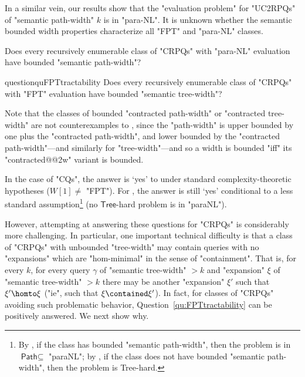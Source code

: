 In a similar vein, our results show that the "evaluation problem" for "UC2RPQs"
of "semantic path-width" $k$ is in "para-NL". It is unknown whether the semantic bounded width properties characterize all "FPT" and "para-NL" classes.

\begin{question}\AP\label{qu:paraNLtractability}
    Does every recursively enumerable class of "CRPQs" with "para-NL" evaluation have bounded "semantic path-width"?
\end{question}

\begin{restatable}{question}{quFPTtractability}
    \AP\label{qu:FPTtractability}
    Does every recursively enumerable class of "CRPQs" with "FPT" evaluation have bounded "semantic tree-width"?
\end{restatable}

Note that the classes of bounded "contracted path-width" or "contracted tree-width" are not counterexamples to , since
the "path-width" is upper bounded by one plus the "contracted path-width", and lower bounded by the "contracted path-width"---and similarly for "tree-width"---and so a width is bounded "iff" its "contracted@@2w" variant is bounded.

In the case of "CQs", the answer is `yes' to  \cite[Theorem~1]{Grohe2007ComplexityHomomorphism}
under standard complexity-theoretic hypotheses ($W[1] \neq $ "FPT"). For , the answer is still `yes' \cite[Theorem 3.1]{ChenMoritz13} conditional to a less standard assumption\footnote{By \cite[Theorems 3.1 \& 4.3]{ChenMoritz13}, if the class has bounded "semantic path-width", then the problem is in $\textsf{Path} \subseteq $ "paraNL"; by \cite[Theorems 3.1 \& 5.5]{ChenMoritz13}, if the class does not have bounded "semantic path-width", then the problem is \textsf{Tree}-hard.} (no $\textsf{Tree}$-hard problem is in "paraNL").

However, attempting at answering these questions for "CRPQs" is considerably more challenging. In particular, one important technical difficulty is that a class of "CRPQs" with unbounded "tree-width" may contain queries with no "expansions" which are "hom-minimal" in the sense of "containment". That is, for every $k$, for every query $\gamma$ of "semantic tree-width" $>k$ and "expansion" $\xi$ of "semantic tree-width" $>k$ there may be another "expansion" $\xi'$ such that $\xi' \homto \xi$ ("ie", such that $\xi \contained \xi'$).  
In fact, for classes of "CRPQs" avoiding such problematic behavior, Question~\ref{qu:FPTtractability} can be positively answered. We next show why.

